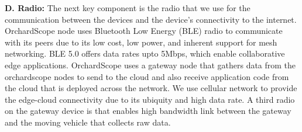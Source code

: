 \noindent
\textbf{D. Radio:}
The next key component is the radio that we use for the communication between the devices and the device's connectivity to the internet. OrchardScope node uses Bluetooth Low Energy (BLE) radio to communicate with its peers due to its low cost, low power, and inherent support for mesh networking. BLE 5.0 offers data rates upto 5Mbps, which enable collaborative edge applications. OrchardScope uses a gateway node that gathers data from the orchardscope nodes to send to the cloud and also receive application code from the cloud that is deployed across the network. We use cellular network to provide the edge-cloud connectivity due to its ubiquity and high data rate. A third radio on the gateway device is that enables high bandwidth link between the gateway and the moving vehicle that collects raw data. 



